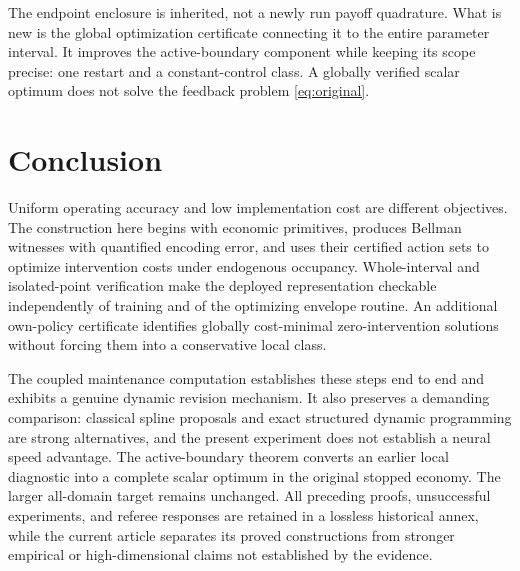 The endpoint enclosure is inherited, not a newly run payoff quadrature. What is new is the global optimization certificate connecting it to the entire parameter interval. It improves the active-boundary component while keeping its scope precise: one restart and a constant-control class. A globally verified scalar optimum does not solve the feedback problem \eqref{eq:original}.

\section{Conclusion}
Uniform operating accuracy and low implementation cost are different objectives. The construction here begins with economic primitives, produces Bellman witnesses with quantified encoding error, and uses their certified action sets to optimize intervention costs under endogenous occupancy. Whole-interval and isolated-point verification make the deployed representation checkable independently of training and of the optimizing envelope routine. An additional own-policy certificate identifies globally cost-minimal zero-intervention solutions without forcing them into a conservative local class.

The coupled maintenance computation establishes these steps end to end and exhibits a genuine dynamic revision mechanism. It also preserves a demanding comparison: classical spline proposals and exact structured dynamic programming are strong alternatives, and the present experiment does not establish a neural speed advantage. The active-boundary theorem converts an earlier local diagnostic into a complete scalar optimum in the original stopped economy. The larger all-domain target remains unchanged. All preceding proofs, unsuccessful experiments, and referee responses are retained in a lossless historical annex, while the current article separates its proved constructions from stronger empirical or high-dimensional claims not established by the evidence.
